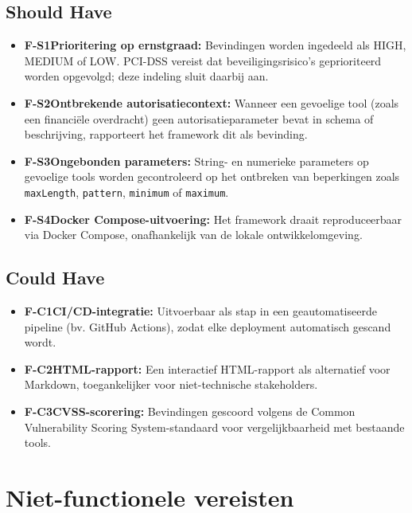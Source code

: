 \subsection*{Should Have}

\begin{itemize}
    \item \textbf{F-S1Prioritering op ernstgraad:} Bevindingen worden ingedeeld als HIGH, MEDIUM of LOW. PCI-DSS vereist dat beveiligingsrisico's geprioriteerd worden opgevolgd; deze indeling sluit daarbij aan.
    \item \textbf{F-S2Ontbrekende autorisatiecontext:} Wanneer een gevoelige tool (zoals een financiële overdracht) geen autorisatieparameter bevat in schema of beschrijving, rapporteert het framework dit als bevinding.
    \item \textbf{F-S3Ongebonden parameters:} String- en numerieke parameters op gevoelige tools worden gecontroleerd op het ontbreken van beperkingen zoals \texttt{maxLength}, \texttt{pattern}, \texttt{minimum} of \texttt{maximum}.
    \item \textbf{F-S4Docker Compose-uitvoering:} Het framework draait reproduceerbaar via Docker Compose, onafhankelijk van de lokale ontwikkelomgeving.
\end{itemize}

\subsection*{Could Have}

\begin{itemize}
    \item \textbf{F-C1CI/CD-integratie:} Uitvoerbaar als stap in een geautomatiseerde pipeline (bv. GitHub Actions), zodat elke deployment automatisch gescand wordt.
    \item \textbf{F-C2HTML-rapport:} Een interactief HTML-rapport als alternatief voor Markdown, toegankelijker voor niet-technische stakeholders.
    \item \textbf{F-C3CVSS-scorering:} Bevindingen gescoord volgens de Common Vulnerability Scoring System-standaard voor vergelijkbaarheid met bestaande tools.
\end{itemize}

\section{Niet-functionele vereisten}

